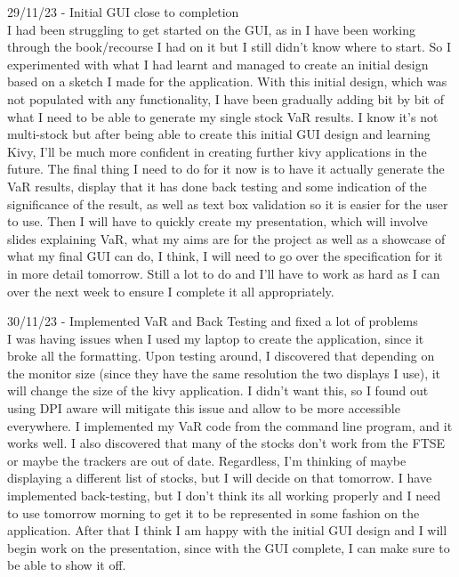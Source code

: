 \documentclass{article}
\begin{document}
29/11/23 - Initial GUI close to completion\\
I had been struggling to get started on the GUI, as in I have been working through the book/recourse I had on it but I still didn't know where to start. So I experimented with what I had learnt and managed to create an initial design based on a sketch I made for the application. With this initial design, which was not populated with any functionality, I have been gradually adding bit by bit of what I need to be able to generate my single stock VaR results. I know it's not multi-stock but after being able to create this initial GUI design and learning Kivy, I'll be much more confident in creating further kivy applications in the future. The final thing I need to do for it now is to have it actually generate the VaR results, display that it has done back testing and some indication of the significance of the result, as well as text box validation so it is easier for the user to use. Then I will have to quickly create my presentation, which will involve slides explaining VaR, what my aims are for the project as well as a showcase of what my final GUI can do, I think, I will need to go over the specification for it in more detail tomorrow. Still a lot to do and I'll have to work as hard as I can over the next week to ensure I complete it all appropriately.\\\vspace{0.3cm}

30/11/23 - Implemented VaR and Back Testing and fixed a lot of problems\\
I was having issues when I used my laptop to create the application, since it broke all the formatting. Upon testing around, I discovered that depending on the monitor size (since they have the same resolution the two displays I use), it will change the size of the kivy application. I didn't want this, so I found out using DPI aware will mitigate this issue and allow to be more accessible everywhere. I implemented my VaR code from the command line program, and it works well. I also discovered that many of the stocks don't work from the FTSE or maybe the trackers are out of date. Regardless, I'm thinking of maybe displaying a different list of stocks, but I will decide on that tomorrow. I have implemented back-testing, but I don't think its all working properly and I need to use tomorrow morning to get it to be represented in some fashion on the application. After that I think I am happy with the initial GUI design and I will begin work on the presentation, since with the GUI complete, I can make sure to be able to show it off.\\\vspace{0.3cm}
\end{document}

